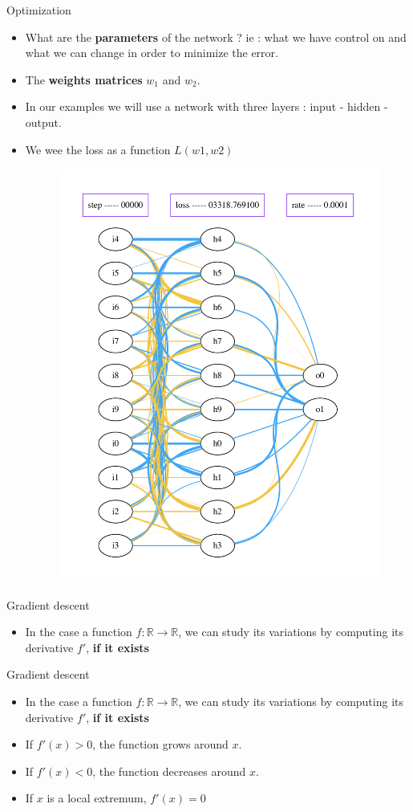 \documentclass{beamer}
\begin{document}
\begin{frame}{Optimization}
    \begin{itemize}
        \item What are the \textbf{{parameters}}  of the network  ? ie : what
            we have control on and what we can change in order to minimize the
            error.
        \item The \textbf{{weights matrices}} $w_1$ and $w_2$.
        \item In our examples we will use a network with three layers : input - hidden - output.
        \item We wee the loss as a function $L(w1,w2)$
            \begin{figure}[htpb]
                \centering
                \includegraphics[width=0.3\linewidth]{net_0}
                \label{fig:name}
            \end{figure}
    \end{itemize}
\end{frame}

\begin{frame}{Gradient descent}
    \begin{itemize}
        \item In the case a function $ f : \mathbb{R}  \rightarrow
            \mathbb{R}$, we can study its variations by computing its
            derivative $f'$, \textbf{{if it exists}}
    \end{itemize}
\end{frame}

\begin{frame}{Gradient descent}
    \begin{itemize}
        \item In the case a function $ f : \mathbb{R}  \rightarrow
            \mathbb{R}$, we can study its variations by computing its
            derivative $f'$, \textbf{{if it exists}}
        \item If $f'(x)>0$, the function grows around $x$.
        \item If $f'(x)<0$, the function decreases around $x$.
        \item If $x$ is a local extremum, $f'(x)=0$

    \end{itemize}
\end{frame}
\end{document}
